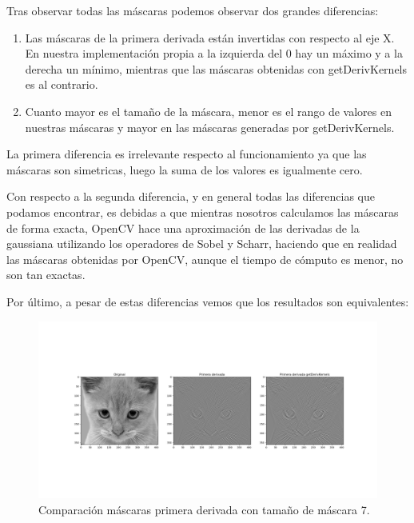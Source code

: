 \documentclass[12pt, spanish]{article}
\begin{document}
\begin{figure}[H]
  	\label{fig:ej1c5}
\end{figure}


Tras observar todas las máscaras podemos observar dos grandes diferencias:

\begin{enumerate}
	\item Las máscaras de la primera derivada están invertidas con respecto al eje X. En nuestra implementación propia a la izquierda del 0 hay un máximo y a la derecha un mínimo, mientras que las máscaras obtenidas con getDerivKernels es al contrario.
	\item Cuanto mayor es el tamaño de la máscara, menor es el rango de valores en nuestras máscaras y mayor en las máscaras generadas por getDerivKernels.
\end{enumerate}

La primera diferencia es irrelevante respecto al funcionamiento ya que las máscaras son simetricas, luego la suma de los valores es igualmente cero.

Con respecto a la segunda diferencia, y en general todas las diferencias que podamos encontrar, es debidas a que mientras nosotros calculamos las máscaras de forma exacta, OpenCV hace una aproximación de las derivadas de la gaussiana utilizando los operadores de Sobel y Scharr\cite{getDerivKernelsCV}, haciendo que en realidad las máscaras obtenidas por OpenCV, aunque el tiempo de cómputo es menor, no son tan exactas.

Por último, a pesar de estas diferencias vemos que los resultados son equivalentes:


\begin{figure}[H]
  \centering
      \includegraphics[width=\textwidth]{1d-1s7.png}
 		 \caption{Comparación máscaras primera derivada con tamaño de máscara 7.}
  		\label{fig:ej1d}

\end{figure}
\end{document}
